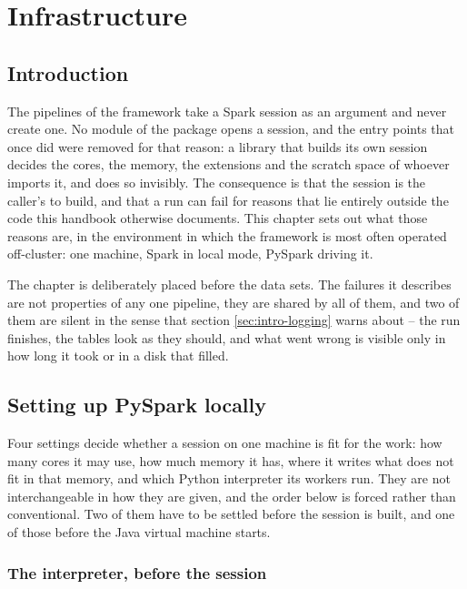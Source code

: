 \chapter{Infrastructure}\label{ch:infrastructure}

\section{Introduction}

The pipelines of the framework take a Spark session as an argument and never create one. No module of the package opens a session, and the entry points that once did were removed for that reason: a library that builds its own session decides the cores, the memory, the extensions and the scratch space of whoever imports it, and does so invisibly. The consequence is that the session is the caller's to build, and that a run can fail for reasons that lie entirely outside the code this handbook otherwise documents. This chapter sets out what those reasons are, in the environment in which the framework is most often operated off-cluster: one machine, Spark in local mode, PySpark driving it.

The chapter is deliberately placed before the data sets. The failures it describes are not properties of any one pipeline, they are shared by all of them, and two of them are silent in the sense that section \ref{sec:intro-logging} warns about -- the run finishes, the tables look as they should, and what went wrong is visible only in how long it took or in a disk that filled.

\section{Setting up PySpark locally\label{sec:infra-pyspark}}

Four settings decide whether a session on one machine is fit for the work: how many cores it may use, how much memory it has, where it writes what does not fit in that memory, and which Python interpreter its workers run. They are not interchangeable in how they are given, and the order below is forced rather than conventional. Two of them have to be settled before the session is built, and one of those before the Java virtual machine starts.

\subsection{The interpreter, before the session}

